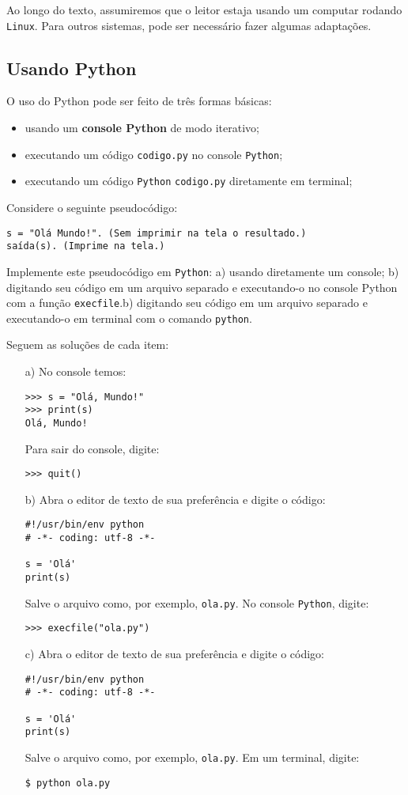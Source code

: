 Ao longo do texto, assumiremos que o leitor estaja usando um computar rodando \verb+Linux+. Para outros sistemas, pode ser necessário fazer algumas adaptações.

\subsection{Usando Python}

O uso do Python pode ser feito de três formas básicas:
\begin{itemize}
\item usando um {\bf console Python} de modo iterativo;
\item executando um código \verb+codigo.py+ no console \verb+Python+;
\item executando um código \verb+Python+ \verb+codigo.py+ diretamente em terminal;
\end{itemize}

\begin{ex}
  Considere o seguinte pseudocódigo:
\begin{verbatim}
s = "Olá Mundo!". (Sem imprimir na tela o resultado.)
saída(s). (Imprime na tela.)
\end{verbatim}
Implemente este pseudocódigo em \verb+Python+: a) usando diretamente um console; b) digitando seu código em um arquivo separado e executando-o no console Python com a função \verb+execfile+.b) digitando seu código em um arquivo separado e executando-o em terminal com o comando \verb+python+.
\end{ex}
\begin{sol} Seguem as soluções de cada item:
  \begin{itemize}
  \item[a)]  No console temos:
\begin{verbatim}
>>> s = "Olá, Mundo!"
>>> print(s)
Olá, Mundo!
\end{verbatim}
Para sair do console, digite:
\begin{verbatim}
>>> quit()
\end{verbatim}
  \item[b)] Abra o editor de texto de sua preferência e digite o código:
\begin{verbatim}
#!/usr/bin/env python
# -*- coding: utf-8 -*-

s = 'Olá'
print(s)
\end{verbatim}
Salve o arquivo como, por exemplo, \verb+ola.py+. No console \verb+Python+, digite:
\begin{verbatim}
>>> execfile("ola.py")
\end{verbatim}
  \item[c)] Abra o editor de texto de sua preferência e digite o código:
\begin{verbatim}
#!/usr/bin/env python
# -*- coding: utf-8 -*-

s = 'Olá'
print(s)
\end{verbatim}
Salve o arquivo como, por exemplo, \verb+ola.py+. Em um terminal, digite:
\begin{verbatim}
$ python ola.py
\end{verbatim}
\end{itemize}
\end{sol}


